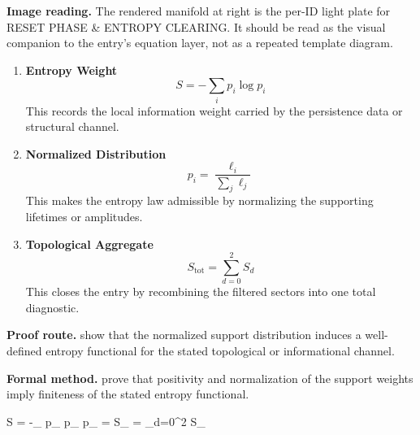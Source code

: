 \begin{samepage}
\noindent\begin{minipage}[t]{0.45\linewidth}
\vspace{0pt}
\raggedright
\scriptsize\textbf{Image reading.} The rendered manifold at right is the per-ID light plate for RESET PHASE \& ENTROPY CLEARING. It should be read as the visual companion to the entry's equation layer, not as a repeated template diagram.\par
\end{minipage}\hfill
\begin{minipage}[t]{0.53\linewidth}
\vspace*{-0.10in}
\raggedright
{}
\end{minipage}
\end{samepage}

\clearpage


\begin{enumerate}[leftmargin=1.6em,itemsep=9pt,topsep=6pt]
\item \textbf{Entropy Weight}
\[
S = -\sum_i p_i \log p_i
\]
This records the local information weight carried by the persistence data or structural channel.

\item \textbf{Normalized Distribution}
\[
p_i = \frac{\ell_i}{\sum_j \ell_j}
\]
This makes the entropy law admissible by normalizing the supporting lifetimes or amplitudes.

\item \textbf{Topological Aggregate}
\[
S_{\mathrm{tot}} = \sum_{d=0}^{2} S_d
\]
This closes the entry by recombining the filtered sectors into one total diagnostic.
\end{enumerate}

\textbf{Proof route.} show that the normalized support distribution induces a well-defined entropy functional for the stated topological or informational channel.

\textbf{Formal method.} prove that positivity and normalization of the support weights imply finiteness of the stated entropy functional.

\medskip
{}

\begin{tzpsnapshot}
\end{tzpsnapshot}

\tzpequationlinks
  {S = -\sum_{} p_{} \log p_{}}
  {p_{} = \cdots}
  {S_{} = \sum_{d=0}^{2} S_{}}

